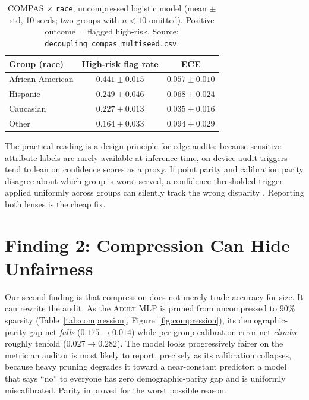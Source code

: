 \documentclass[11pt]{article}
\newcommand{\dataset}[1]{\textsc{#1}}
\begin{document}
\begin{table}[t]
\centering
\caption{\dataset{COMPAS} $\times$ \texttt{race}, uncompressed logistic model
(mean $\pm$ std, 10 seeds; two groups with $n<10$ omitted). Positive outcome =
flagged high-risk. Source: \texttt{decoupling\_compas\_multiseed.csv}.}
\label{tab:decoup-compas}
\begin{tabular}{lcc}
\toprule
Group (race) & High-risk flag rate & ECE \\
\midrule
African-American & $\mathbf{0.441 \pm 0.015}$ & $0.057 \pm 0.010$ \\
Hispanic         & $0.249 \pm 0.046$ & $0.068 \pm 0.024$ \\
Caucasian        & $0.227 \pm 0.013$ & $\mathbf{0.035 \pm 0.016}$ \\
Other            & $0.164 \pm 0.033$ & $0.094 \pm 0.029$ \\
\bottomrule
\end{tabular}
\end{table}

The practical reading is a design principle for edge audits: because
sensitive-attribute labels are rarely available at inference time, on-device
audit triggers tend to lean on confidence scores as a proxy. If point parity and
calibration parity disagree about which group is worst served, a
confidence-thresholded trigger applied uniformly across groups can silently track
the wrong disparity \cite{kenfack2023fairness}. Reporting both lenses is the
cheap fix.

\section{Finding 2: Compression Can Hide Unfairness}
\label{sec:compression}

Our second finding is that compression does not merely trade accuracy for size.
It can rewrite the audit. As the \dataset{Adult} MLP is pruned from uncompressed
to 90\% sparsity (Table~\ref{tab:compression}, Figure~\ref{fig:compression}), its
demographic-parity gap net \emph{falls} ($0.175 \rightarrow 0.014$) while
per-group calibration error net \emph{climbs} roughly tenfold
($0.027 \rightarrow 0.282$). The model looks progressively fairer on the metric
an auditor is most likely to report, precisely as its calibration collapses,
because heavy pruning degrades it toward a near-constant predictor: a model that
says ``no'' to everyone has zero demographic-parity gap and is uniformly
miscalibrated. Parity improved for the worst possible reason.
\end{document}
